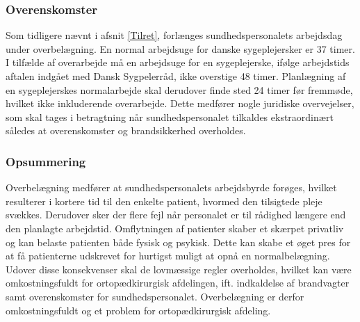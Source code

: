 \subsubsection{Overenskomster}
Som tidligere nævnt i afsnit \ref{Tilret}, forlænges sundhedspersonalets arbejdsdag under overbelægning. En normal arbejdsuge for danske sygeplejersker er 37 timer. I tilfælde af overarbejde må en arbejdsuge for en sygeplejerske, ifølge arbejdstids aftalen indgået med Dansk Sygpelerråd, ikke overstige 48 timer. Planlægning af en sygeplejerskes normalarbejde skal derudover finde sted 24 timer før fremmøde, hvilket ikke inkluderende overarbejde. \cite{Danske2015}  Dette medfører nogle juridiske overvejelser, som skal tages i betragtning når sundhedspersonalet tilkaldes ekstraordinært således at overenskomster og brandsikkerhed overholdes. 


\subsubsection{Opsummering}
Overbelægning medfører at sundhedspersonalets arbejdsbyrde forøges, hvilket resulterer i kortere tid til den enkelte patient, hvormed den tilsigtede pleje svækkes. \cite{Dinges2004} \cite{Aiken2002} Derudover sker der flere fejl når personalet er til rådighed længere end den planlagte arbejdstid.\cite{Dinges2004} Omflytningen af patienter skaber et skærpet privatliv og kan belaste patienten både fysisk og psykisk. \cite{Madsen2014} \cite{Heidmann2014} Dette kan skabe et øget pres for at få patienterne udskrevet for hurtigst muligt at opnå en normalbelægning. Udover disse konsekvenser skal de lovmæssige regler overholdes, hvilket kan være omkostningsfuldt for ortopædkirurgisk afdelingen, ift. indkaldelse af brandvagter samt overenskomster for sundhedspersonalet. \cite{Beredskab2016}\cite{Danske2015} Overbelægning er derfor omkostningsfuldt og et problem for ortopædkirurgisk afdeling.
